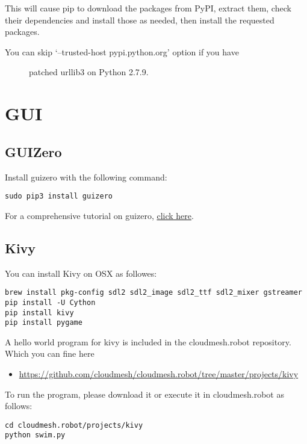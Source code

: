 This will cause pip to download the packages from PyPI, extract them,
check their dependencies and install those as needed, then install the
requested packages.

\begin{description}
\item[You can skip `--trusted-host pypi.python.org' option if you have]
patched urllib3 on Python 2.7.9.
\end{description}

\section{GUI}\label{gui}

\subsection{GUIZero}\label{guizero}

Install guizero with the following command:

\begin{verbatim}
sudo pip3 install guizero
\end{verbatim}

For a comprehensive tutorial on guizero,
\href{https://lawsie.github.io/guizero/howto/}{click here}.

\subsection{Kivy}\label{kivy}

You can install Kivy on OSX as followes:

\begin{verbatim}
brew install pkg-config sdl2 sdl2_image sdl2_ttf sdl2_mixer gstreamer
pip install -U Cython
pip install kivy
pip install pygame
\end{verbatim}

A hello world program for kivy is included in the cloudmesh.robot
repository. Which you can fine here

\begin{itemize}
\tightlist
\item
  \url{https://github.com/cloudmesh/cloudmesh.robot/tree/master/projects/kivy}
\end{itemize}

To run the program, please download it or execute it in cloudmesh.robot
as follows:

\begin{verbatim}
cd cloudmesh.robot/projects/kivy
python swim.py
\end{verbatim}

